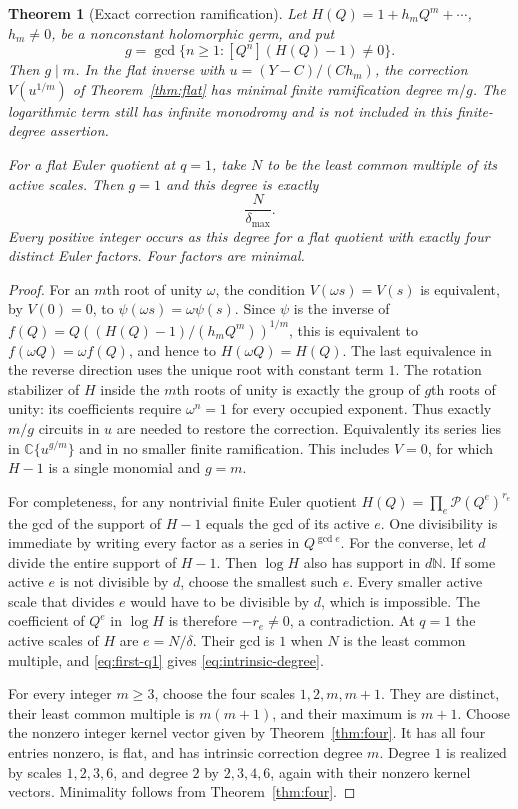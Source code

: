 \documentclass[11pt,a4paper]{article}
\numberwithin{equation}{section}
\newtheorem{theorem}{Theorem}[section]
\theoremstyle{definition}\newtheorem{definition}[theorem]{Definition}
\theoremstyle{remark}\newtheorem{remark}[theorem]{Remark}
\newcommand{\C}{\mathbb C}\newcommand{\Q}{\mathbb Q}\newcommand{\Z}{\mathbb Z}
\newcommand{\N}{\mathbb N}\newcommand{\R}{\mathbb R}
\newcommand{\Poch}{\mathcal P}\newcommand{\F}{\mathcal F}
\begin{document}
\begin{theorem}[Exact correction ramification]\label{thm:ramification}
Let $H(Q)=1+h_mQ^m+\cdots$, $h_m\ne0$, be a nonconstant holomorphic
germ, and put
\[
 g=\gcd\{n\ge1:[Q^n](H(Q)-1)\ne0\}.
\]
Then $g\mid m$. In the flat inverse with
$u=(Y-C)/(Ch_m)$, the correction $V(u^{1/m})$ of
Theorem~\ref{thm:flat} has minimal finite ramification degree $m/g$.
The logarithmic term still has infinite monodromy and is not included
in this finite-degree assertion.

For a flat Euler quotient at $q=1$, take $N$ to be the least common
multiple of its active scales. Then $g=1$ and this degree is exactly
\begin{equation}\label{eq:intrinsic-degree}
 \frac{N}{\delta_{\max}}.
\end{equation}
Every positive integer occurs as this degree for a flat quotient with
exactly four distinct Euler factors. Four factors are minimal.
\end{theorem}
\begin{proof}
For an $m$th root of unity $\omega$, the condition
$V(\omega s)=V(s)$ is equivalent, by $V(0)=0$, to
$\psi(\omega s)=\omega\psi(s)$. Since $\psi$ is the inverse of
$f(Q)=Q((H(Q)-1)/(h_mQ^m))^{1/m}$, this is equivalent to
$f(\omega Q)=\omega f(Q)$, and hence to $H(\omega Q)=H(Q)$.
The last equivalence in the reverse direction uses the unique root
with constant term $1$. The rotation stabilizer of $H$ inside the
$m$th roots of unity is exactly the group of $g$th roots of unity:
its coefficients require $\omega^n=1$ for every occupied exponent.
Thus exactly $m/g$ circuits in $u$ are needed to restore the correction.
Equivalently its series lies in $\C\{u^{g/m}\}$ and in no smaller
finite ramification. This includes $V=0$, for which $H-1$ is a single
monomial and $g=m$.

For completeness, for any nontrivial finite Euler quotient
$H(Q)=\prod_e\Poch(Q^e)^{r_e}$ the gcd of the support of $H-1$ equals
the gcd of its active $e$. One divisibility is immediate by writing
every factor as a series in $Q^{\gcd e}$. For the converse, let $d$
divide the entire support of $H-1$. Then $\log H$ also has support in
$d\N$. If some active $e$ is not divisible by $d$, choose the smallest
such $e$. Every smaller active scale that divides $e$ would have to be
divisible by $d$, which is impossible. The coefficient of $Q^e$ in
$\log H$ is therefore $-r_e\ne0$, a contradiction.
At $q=1$ the active scales of $H$ are $e=N/\delta$. Their gcd is $1$
when $N$ is the least common multiple, and
\eqref{eq:first-q1} gives \eqref{eq:intrinsic-degree}.

For every integer $m\ge3$, choose the four scales
$1,2,m,m+1$. They are distinct, their least common multiple is
$m(m+1)$, and their maximum is $m+1$. Choose the nonzero integer kernel
vector given by Theorem~\ref{thm:four}. It has all four entries nonzero,
is flat, and has intrinsic correction degree $m$. Degree $1$ is realized
by scales $1,2,3,6$, and degree $2$ by $2,3,4,6$, again with their
nonzero kernel vectors. Minimality follows from Theorem~\ref{thm:four}.
\end{proof}
\end{document}

